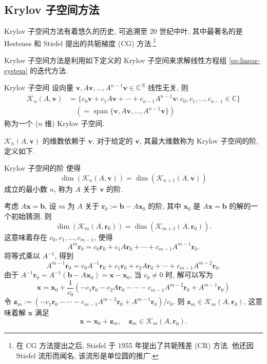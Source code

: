 \subsection{Krylov 子空间方法}\label{sec:krylov-subspace-methods}

Krylov 子空间方法有着悠久的历史, 可追溯至 20 世纪中叶, 其中最著名的是 Hestenes 和 Stiefel 提出的共轭梯度 (CG) 方法.\footnote{在 CG 方法提出之后, Stiefel 于 1955 年提出了共轭残差 (CR) 方法. 他还因 Stiefel 流形而闻名, 该流形是单位圆的推广.}

Krylov 子空间方法是利用如下定义的 Krylov 子空间来求解线性方程组 \eqref{eq:linear-system} 的迭代方法.

\begin{Definition}{Krylov 子空间}\label{def:krylov-subspace}
设向量 $\bm v,A\bm v,\ldots,A^{n-1}\bm v\in\mathbb C^N$ 线性无关, 则
\begin{equation}\label{eq:krylov-subspace-span}
\begin{aligned}
\mathcal K_n(A,\bm v)&=\{c_0\bm v+c_1A\bm v+\cdots+c_{n-1}A^{n-1}\bm v:c_0,c_1,\ldots,c_{n-1}\in\mathbb C\}\\
&\quad(=\operatorname{span}\{\bm v,A\bm v,\ldots,A^{n-1}\bm v\})
\end{aligned}
\end{equation}
称为一个 ($n$ 维) Krylov 子空间.
\end{Definition}

$\mathcal K_n(A,\bm v)$ 的维数依赖于 $\bm v$, 对于给定的 $\bm v$, 其最大维数称为 Krylov 子空间的阶, 定义如下.

\begin{Definition}{Krylov 子空间的阶}\label{def:krylov-grade}
使得
\begin{equation}\label{eq:krylov-grade-stabilization}
\dim(\mathcal K_n(A,\bm v))=\dim(\mathcal K_{n+1}(A,\bm v))
\end{equation}
成立的最小数 $n$, 称为 $A$ 关于 $\bm v$ 的阶.
\end{Definition}

考虑 $A\bm x=\bm b$, 设 $m$ 为 $A$ 关于 $\bm r_0:=\bm b-A\bm x_0$ 的阶, 其中 $\bm x_0$ 是 $A\bm x=\bm b$ 的解的一个初始猜测. 则
\[
\dim(\mathcal K_m(A,\bm r_0))=\dim(\mathcal K_{m+1}(A,\bm r_0)).
\]
这意味着存在 $c_0,c_1,\ldots,c_{m-1}$, 使得
\[
A^m\bm r_0=c_0\bm r_0+c_1A\bm r_0+\cdots+c_{m-1}A^{m-1}\bm r_0.
\]
将等式乘以 $A^{-1}$, 得到
\[
A^{m-1}\bm r_0=c_0A^{-1}\bm r_0+c_1\bm r_0+c_2A\bm r_0+\cdots+c_{m-1}A^{m-2}\bm r_0.
\]
由于 $A^{-1}\bm r_0=A^{-1}(\bm b-A\bm x_0)=\bm x-\bm x_0$, 当 $c_0\ne0$ 时, 解可以写为
\[
\bm x=\bm x_0+\frac{1}{c_0}(-c_1\bm r_0-c_2A\bm r_0-\cdots-c_{m-1}A^{m-2}\bm r_0+A^{m-1}\bm r_0)
\]
令 $\bm z_m:=(-c_1\bm r_0-\cdots-c_{m-1}A^{m-2}\bm r_0+A^{m-1}\bm r_0)/c_0$. 则 $\bm z_m\in\mathcal K_m(A,\bm r_0)$, 这意味着解 $\bm x$ 满足
\[
\bm x=\bm x_0+\bm z_m,\quad\bm z_m\in\mathcal K_m(A,\bm r_0).
\]

